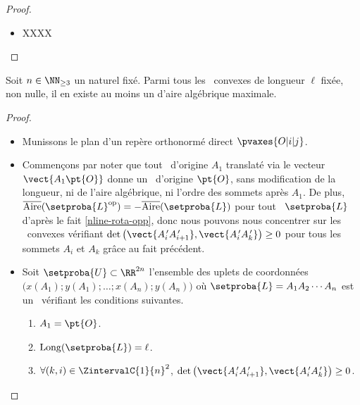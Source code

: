 \begin{proof}
    \begin{itemize}
		\item XXXX
    \end{itemize}
	
	\null\vspace{-6ex}
\end{proof}




\newpage

\begin{fact} \label{at-least-one-ncycle}
    Soit $n \in \NN_{\geq3}$ un naturel fixé.
    Parmi tous les \ncycles\ convexes de longueur $\ell$ fixée, non nulle, il en existe au moins un d'aire algébrique maximale.
\end{fact}


\begin{proof}
	\leavevmode
	\begin{itemize}
		\item Munissons le plan d'un repère orthonormé direct $\pvaxes{O | i | j}$.


        \item Commençons par noter que tout \ncycle\ d'origine $A_1$ translaté via le vecteur $\vect{A_1 \pt{O}}$ donne un \ncycle\ d'origine $\pt{O}$, sans modification de la longueur, ni de l'aire algébrique, ni l'ordre des sommets après $A_1$.
        De plus, $\sarea{\setproba{L}^{\mathrm{op}}} = - \sarea{\setproba{L}}$ pour tout \ncycle\ $\setproba{L}$ d'après le fait \ref{nline-rota-opp}, donc nous pouvons nous concentrer sur les \ncycles\ convexes vérifiant $\det \big( \vect{A^{\,\prime}_i A^{\,\prime}_{i+1}}, \vect{A^{\,\prime}_i A^{\,\prime}_k} \big) \geq 0$ pour tous les sommets $A_i$ et $A_k$ grâce au fait précédent.


        \item Soit $\setproba{U} \subset \RR^{2n}$ l'ensemble des uplets de coordonnées $\big( x(A_1) ; y(A_1) ; \dots ; x(A_n) ; y(A_n) \big)$ où $\setproba{L} = A_1 A_2 \cdots A_n$ est un \ncycle\ vérifiant les conditions suivantes.
	    \begin{enumerate}
	    	\item $A_1 = \pt{O}$.

	    	\item $\cyclelen{\setproba{L}} = \ell$.

		    \item
		    $\forall (k, i) \in \ZintervalC{1}{n}^2$,
		    $\det \big( \vect{A^{\,\prime}_i A^{\,\prime}_{i+1}}, \vect{A^{\,\prime}_i A^{\,\prime}_k} \big) \geq 0$.
	    \end{enumerate}



\end{itemize}
\end{proof}
